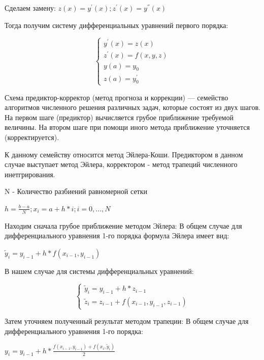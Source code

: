 Сделаем замену: 
\begin{math}
	z(x)=y^{'}(x); z^{'}(x)=y^{''}(x)
\end{math}

Тогда получим систему дифференциальных уравнений первого порядка: 

\begin{equation}
	\begin{cases}
		y^{'}(x)=z(x) \\
		z^{'}(x)=f(x,y,z) \\
		y(a) = y_{0} \\
		z(a) = y^{'}_{0}
	\end{cases}
\end{equation}

Схема предиктор-корректор (метод прогноза и коррекции) — семейство алгоритмов численного решения различных задач, которые состоят из двух шагов. На первом шаге (предиктор) вычисляется грубое приближение требуемой величины. На втором шаге при помощи иного метода приближение уточняется (корректируется).

К данному семейству относится метод Эйлера-Коши. Предиктором в данном случае выступает метод Эйлера, корректором - метод трапеций численного инетгрирования.

N - Количество разбиений равномерной сетки

\begin{math}
	h = \frac{b-a}{N}; x_{i}=a+h*i; i=0,...,N
\end{math}

Находим сначала грубое приближение методом Эйлера:
В общем случае для дифференциального уравнения 1-го порядка формула Эйлера имеет вид: 

\begin{math}
	\tilde y_{i}=y_{i-1}+h*f(x_{i-1},y_{i-1})
\end{math}

В нашем случае для системы дифференциальных уравнений:

\begin{equation}
	\begin{cases}
		\tilde y_{i} = y_{i-1} + h * z_{i-1} \\
		\tilde z_{i} = z_{i-1} + f(x_{i-1},y_{i-1},z_{i-1}) 
	\end{cases}
\end{equation}

Затем уточняем полученный результат методом трапеции:
В общем случае для дифференциального уравнения 1-го порядка: 

\begin{math}
	y_{i}=y_{i-1}+h*\frac{f(x_{i-1},y_{i-1})+f(x_{i},\tilde y_{i})}{2}
\end{math}

